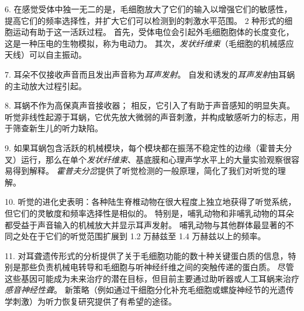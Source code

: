 6. 在感觉受体中独一无二的是，毛细胞放大了它们的输入以增强它们的敏感性，提高它们的频率选择性，并扩大它们可以检测到的刺激水平范围。
2 种形式的细胞运动有助于这一活跃过程。
首先，受体电位会引起外毛细胞胞体的长度变化，这是一种压电的生物模拟，称为电动力。
其次，\textit{发状纤维束}（毛细胞的机械感应天线）可以自主振动。


7. 耳朵不仅接收声音而且发出声音称为\textit{耳声发射}。
自发和诱发的\textit{耳声发射}由耳蜗的主动放大过程引起。


8. 耳蜗不作为高保真声音接收器；
相反，它引入了有助于声音感知的明显失真。
听觉非线性起源于耳蜗，它优先放大微弱的声音刺激，并构成敏感听力的标志，用于筛查新生儿的听力缺陷。


9. 如果耳蜗包含活跃的机械模块，每个模块都在振荡不稳定性的边缘（霍普夫分叉）运行，那么在单个\textit{发状纤维束}、基底膜和心理声学水平上的大量实验观察很容易得到解释。
\textit{霍普夫分岔}提供了听觉检测的一般原理，简化了我们对听觉的理解。


10. 听觉的进化史表明：各种陆生脊椎动物在很大程度上独立地获得了听觉系统，但它们的灵敏度和频率选择性是相似的。
特别是，哺乳动物和非哺乳动物的耳朵都受益于声音输入的机械放大并显示耳声发射。
哺乳动物与其他群体最显著的不同之处在于它们的听觉范围扩展到 1.2 万赫兹至 1.4 万赫兹以上的频率。


11. 对耳聋遗传形式的分析提供了关于毛细胞功能的数十种关键蛋白质的信息，特别是那些负责机械电转导和毛细胞与听神经纤维之间的突触传递的蛋白质。
尽管这些基因可能成为未来治疗的潜在目标，但目前主要通过助听器或人工耳蜗来治疗\textit{感音神经性聋}。
新策略（例如通过干细胞分化补充毛细胞或螺旋神经节的光遗传学刺激）为听力恢复研究提供了有希望的途径。


